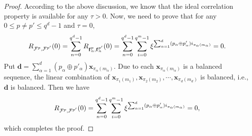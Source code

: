 \documentclass[11pt]{article}
\newcommand{\2} {$2$-to-$1$}
\begin{document}
\begin{proof}
According to the above discussion, we know that the ideal correlation property is available for any $ \tau>0$.  Now, we need to prove that for any  $ 0 \leq p\neq p'\leq q^d-1 $ and $ \tau=0$,
	\begin{align*}
		R_{\mathcal{\textcolor{black}{F}}^{p},\mathcal{\textcolor{black}{F}}^{p'}}(0)
		=\sum_{n=0}^{q^{d}-1}R_{\mathbf{\textcolor{black}{f}}^{p}_{n},\mathbf{\textcolor{black}{f}}^{p'}_{n}}(0)
		=\sum_{n=0}^{q^{d}-1}\sum_{i=0}^{q^m-1}\xi^{\sum_{\alpha=1}^{d}(p_{\alpha}\oplus p'_{\alpha})i_{\pi_{\alpha}(m_\alpha)}}
		=0.
	\end{align*}
	Put $ \textbf{d}=\sum_{\alpha=1}^{d}(p_{\alpha}\oplus p'_{\alpha})\textbf{x}_{\pi_{\alpha}(m_{\alpha})} $. Due to  each $ \textbf{x}_{\pi_{\alpha}(m_{\alpha})} $ is a balanced sequence, the linear combination of  $\textbf{x}_{\pi_{1}(m_{1})},\textbf{x}_{\pi_{2}(m_{2})},\cdots,\textbf{x}_{\pi_{d}(m_{d})} $ is balanced, i.e., $ \textbf{d} $ is balanced. Then we have
	\begin{align*}
	R_{\mathcal{	\textcolor{black}{F}}^{p},\mathcal{\textcolor{black}{F}}^{p'}}(0)=
		\sum_{n=0}^{q^{d}-1}\sum_{i=0}^{q^m-1}\xi^{\sum_{\alpha=1}^{d}(p_{\alpha}\oplus p'_{\alpha})i_{\pi_{\alpha}(m_\alpha)}}
		=0,
	\end{align*}
	which completes the proof.
	
	
	
\end{proof}
\end{document}
